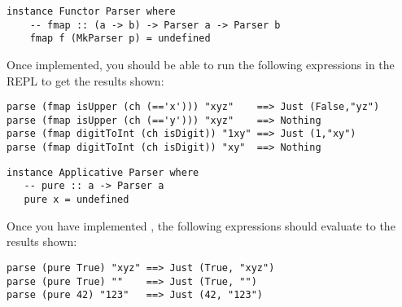 \taskLine 

\begin{verbatim}
instance Functor Parser where 
    -- fmap :: (a -> b) -> Parser a -> Parser b
    fmap f (MkParser p) = undefined
\end{verbatim}
Once implemented, you should be able to run the following expressions in the REPL to get the results shown:
\begin{verbatim}
parse (fmap isUpper (ch (=='x'))) "xyz"    ==> Just (False,"yz")
parse (fmap isUpper (ch (=='y'))) "xyz"    ==> Nothing
parse (fmap digitToInt (ch isDigit)) "1xy" ==> Just (1,"xy")
parse (fmap digitToInt (ch isDigit)) "xy"  ==> Nothing
\end{verbatim}

\taskLine 

\begin{verbatim}
instance Applicative Parser where
   -- pure :: a -> Parser a
   pure x = undefined
\end{verbatim}
Once you have implemented , the following expressions should evaluate to the results shown:
\begin{verbatim}
parse (pure True) "xyz" ==> Just (True, "xyz")
parse (pure True) ""    ==> Just (True, "")
parse (pure 42) "123"   ==> Just (42, "123")
\end{verbatim}

